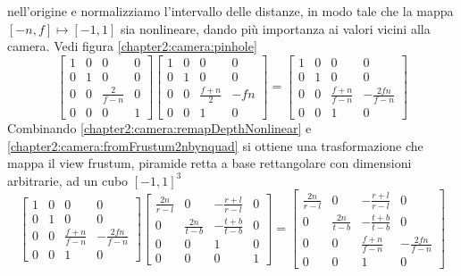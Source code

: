 nell'origine e normalizziamo l'intervallo delle distanze, in modo tale che la mappa $[-n,f] \mapsto [-1,1]$ sia nonlineare, 
dando pi\`u importanza ai valori vicini alla camera. Vedi figura \ref{chapter2:camera:pinhole} 
\begin{equation}\label{chapter2:camera:remapDepthNonlinear}
	\begin{bmatrix}
		1 & 0 & 0 & 0 \\ 0 & 1 & 0 & 0 \\ 0 & 0 & \frac{2}{f-n} & 0 \\ 0 & 0 & 0 & 1
	\end{bmatrix}
	\begin{bmatrix}
		1 & 0 & 0 & 0 \\ 0 & 1 & 0 & 0 \\ 0 & 0 & \frac{f+n}{2} & -fn \\ 0 & 0 & 1 & 0
	\end{bmatrix}
	=
	\begin{bmatrix}
		1 & 0 & 0 & 0 \\ 0 & 1 & 0 & 0 \\ 0 & 0 & \frac{f+n}{f-n} & -\frac{2fn}{f-n} \\ 0 & 0 & 1 & 0
	\end{bmatrix}
\end{equation}
Combinando \ref{chapter2:camera:remapDepthNonlinear} e \ref{chapter2:camera:fromFrustum2nbynquad} si ottiene una trasformazione che mappa il view
frustum, piramide retta a base rettangolare con dimensioni arbitrarie, ad un cubo $[-1,1]^3$
\begin{equation}\label{chapter2:camera:perspectiveMatrix}
	\begin{bmatrix}
		1 & 0 & 0 & 0 \\ 0 & 1 & 0 & 0 \\ 0 & 0 & \frac{f+n}{f-n} & -\frac{2fn}{f-n} \\ 0 & 0 & 1 & 0
	\end{bmatrix}
	\begin{bmatrix}
		\frac{2n}{r-l} & 0 & -\frac{r+l}{r-l} & 0 \\ 0 & \frac{2n}{t-b} & -\frac{t+b}{t-b} & 0 \\ 0 & 0 & 1 & 0 \\ 0 & 0 & 0 & 1
	\end{bmatrix}
	=
	\begin{bmatrix}
		\frac{2n}{r-l} & 0 & -\frac{r+l}{r-l} & 0 \\ 0 & \frac{2n}{t-b} & -\frac{t+b}{t-b} & 0 \\ 0 & 0 & \frac{f+n}{f-n} & -\frac{2fn}{f-n} 
		\\ 0 & 0 & 1 & 0
	\end{bmatrix}
\end{equation}
